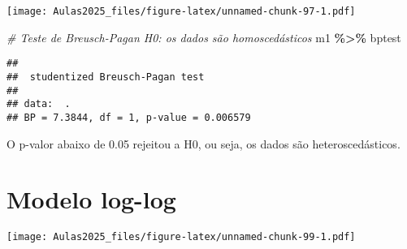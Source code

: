 \documentclass[
]{book}
\newenvironment{Shaded}{\begin{snugshade}}{\end{snugshade}}
\newcommand{\AttributeTok}[1]{\textcolor[rgb]{0.13,0.29,0.53}{#1}}
\newcommand{\CommentTok}[1]{\textcolor[rgb]{0.56,0.35,0.01}{\textit{#1}}}
\newcommand{\DecValTok}[1]{\textcolor[rgb]{0.00,0.00,0.81}{#1}}
\newcommand{\FunctionTok}[1]{\textcolor[rgb]{0.13,0.29,0.53}{\textbf{#1}}}
\newcommand{\NormalTok}[1]{#1}
\newcommand{\OtherTok}[1]{\textcolor[rgb]{0.56,0.35,0.01}{#1}}
\newcommand{\SpecialCharTok}[1]{\textcolor[rgb]{0.81,0.36,0.00}{\textbf{#1}}}
\newcommand{\StringTok}[1]{\textcolor[rgb]{0.31,0.60,0.02}{#1}}
\begin{document}
\begin{Shaded}
\end{Shaded}

\texttt{[image: Aulas2025\_files/figure-latex/unnamed-chunk-97-1.pdf]}

\begin{Shaded}
\begin{Highlighting}[]
\CommentTok{\# Teste de Breusch{-}Pagan H0: os dados são homoscedásticos}
\NormalTok{m1 }\SpecialCharTok{\%\textgreater{}\%}
\NormalTok{    bptest}
\end{Highlighting}
\end{Shaded}

\begin{verbatim}
## 
##  studentized Breusch-Pagan test
## 
## data:  .
## BP = 7.3844, df = 1, p-value = 0.006579
\end{verbatim}

O p-valor abaixo de 0.05 rejeitou a H0, ou seja, os dados são
heteroscedásticos.

\hypertarget{modelo-log-log}{%
\section{Modelo log-log}\label{modelo-log-log}}

\begin{Shaded}
\end{Shaded}

\texttt{[image: Aulas2025\_files/figure-latex/unnamed-chunk-99-1.pdf]}

\begin{Shaded}
\end{Shaded}
\end{document}
